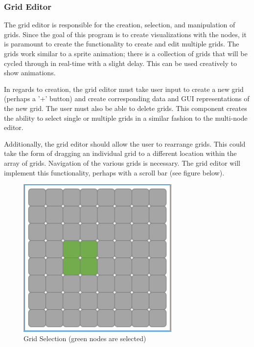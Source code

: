 \documentclass[12pt]{article}
\begin{document}
	\subsubsection {Grid Editor}
	The grid editor is responsible for the creation, selection, and manipulation of grids. Since the goal of this program is to create visualizations with the nodes, it is paramount to create the functionality to create and edit multiple grids. The grids work similar to a sprite animation; there is a collection of grids that will be cycled through in real-time with a slight delay. This can be used creatively to show animations.
	
	In regards to creation, the grid editor must take user input to create a new grid (perhaps a '+' button) and create corresponding data and GUI representations of the new grid. The user must also be able to delete grids. This component creates the ability to select single or multiple grids in a similar fashion to the multi-node editor.
	
	Additionally, the grid editor should allow the user to rearrange grids. This could take the form of dragging an individual grid to a different location within the array of grids. Navigation of the various grids is necessary. The grid editor will implement this functionality, perhaps with a scroll bar (see figure below).
	
	\begin{figure}[ht!]
		\centering
		\includegraphics[width=80mm]{Grid.png}
		\caption{Grid Selection (green nodes are selected)}
	\end{figure}
	
\end{document}
